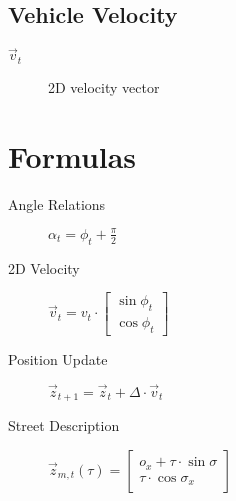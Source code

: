 \documentclass[a4paper]{article}
\begin{document}
    \subsection{Vehicle Velocity}
    \begin{description}
        \item[$\vec{v}_t$] 2D velocity vector
    \end{description}

    \section{Formulas}
    \begin{description}
        \item[Angle Relations] $\alpha_t = \phi_t + \frac{\pi}{2}$
        \item[2D Velocity] $\vec{v}_t = v_t \cdot \begin{bmatrix}
            \sin{\phi_t} \\
            \cos{\phi_t}
        \end{bmatrix}$ 
        \item[Position Update] $\vec{z}_{t+1} = \vec{z}_{t} + \Delta \cdot \vec{v}_t$
        \item[Street Description] $\vec{z}_{m,t}(\tau) = \begin{bmatrix}
            o_x + \tau \cdot \sin{\sigma} \\
            \tau \cdot \cos{\sigma_x}
        \end{bmatrix}$ 
    \end{description}

    
\end{document}
